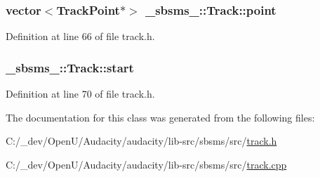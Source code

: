 \subsubsection[{\texorpdfstring{point}{point}}]{\setlength{\rightskip}{0pt plus 5cm}vector$<${\bf Track\+Point}$\ast$$>$ \+\_\+sbsms\+\_\+\+::\+Track\+::point\hspace{0.3cm}{\ttfamily [protected]}}\hypertarget{class__sbsms___1_1_track_a43f2ce38605ca228eb6be02a490591ab}{}\label{class__sbsms___1_1_track_a43f2ce38605ca228eb6be02a490591ab}


Definition at line 66 of file track.\+h.

\subsubsection[{\texorpdfstring{start}{start}}]{ \+\_\+sbsms\+\_\+\+::\+Track\+::start\hspace{0.3cm}{\ttfamily [protected]}}\hypertarget{class__sbsms___1_1_track_a6bee6547dd2d96175c2930c46dcdca8b}{}\label{class__sbsms___1_1_track_a6bee6547dd2d96175c2930c46dcdca8b}


Definition at line 70 of file track.\+h.



The documentation for this class was generated from the following files\+:\begin{DoxyCompactItemize}
\item 
C\+:/\+\_\+dev/\+Open\+U/\+Audacity/audacity/lib-\/src/sbsms/src/\hyperlink{lib-src_2sbsms_2src_2track_8h}{track.\+h}\item 
C\+:/\+\_\+dev/\+Open\+U/\+Audacity/audacity/lib-\/src/sbsms/src/\hyperlink{lib-src_2sbsms_2src_2track_8cpp}{track.\+cpp}\end{DoxyCompactItemize}
